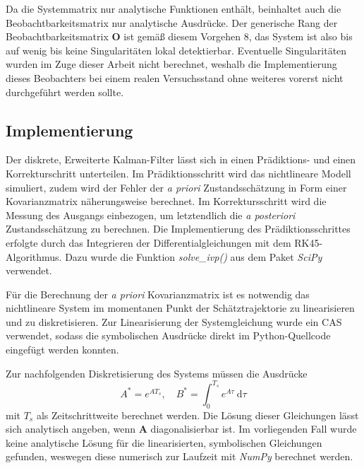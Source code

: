 \documentclass[10pt,twocolumn]{article}
\begin{document}
	Da die Systemmatrix nur analytische Funktionen enthält, beinhaltet auch die Beobachtbarkeitsmatrix nur analytische Ausdrücke. 
	Der generische Rang der Beobachtbarkeitsmatrix $\bm O$ ist gemäß diesem Vorgehen 8, das System ist also bis auf wenig bis keine Singularitäten lokal detektierbar.
	Eventuelle Singularitäten wurden im Zuge dieser Arbeit nicht berechnet, weshalb die Implementierung dieses Beobachters bei einem realen Versuchsstand ohne weiteres vorerst nicht durchgeführt werden sollte.
	
	\subsection{Implementierung}
	Der diskrete, Erweiterte Kalman-Filter lässt sich in einen Prädiktions- und einen Korrekturschritt unterteilen. 
	Im Prädiktionsschritt wird das nichtlineare Modell simuliert, zudem wird der Fehler der \textit{a priori} Zustandsschätzung in Form einer Kovarianzmatrix näherungsweise berechnet.
	Im Korrektursschritt wird die Messung des Ausgangs einbezogen, um letztendlich die \textit{a posteriori} Zustandsschätzung zu berechnen.
	Die Implementierung des Prädiktionsschrittes erfolgte durch das Integrieren der Differentialgleichungen mit dem RK45-Algorithmus.
	Dazu wurde die Funktion \textit{solve\_ivp()} aus dem Paket \textit{SciPy} verwendet.
	
	Für die Berechnung der \textit{a priori} Kovarianzmatrix ist es notwendig das nichtlineare System im momentanen Punkt der Schätztrajektorie zu linearisieren und zu diskretisieren.
	Zur Linearisierung der Systemgleichung wurde ein CAS verwendet, sodass die symbolischen Ausdrücke direkt im Python-Quellcode eingefügt werden konnten.
	
	Zur nachfolgenden Diskretisierung des Systems müssen die Ausdrücke
	$$A^* = e^{A T_s},\quad B^* = \int_{0}^{T_s} e^{A \tau} \: \mathrm{d}\tau$$
	mit $T_s$ als Zeitschrittweite berechnet werden. 
	Die Lösung dieser Gleichungen lässt sich analytisch angeben, wenn $\bm A$	diagonalisierbar ist.
	Im vorliegenden Fall wurde keine analytische Lösung für die linearisierten, symbolischen Gleichungen gefunden, weswegen diese numerisch zur Laufzeit mit \textit{NumPy} berechnet werden.

\end{document}
